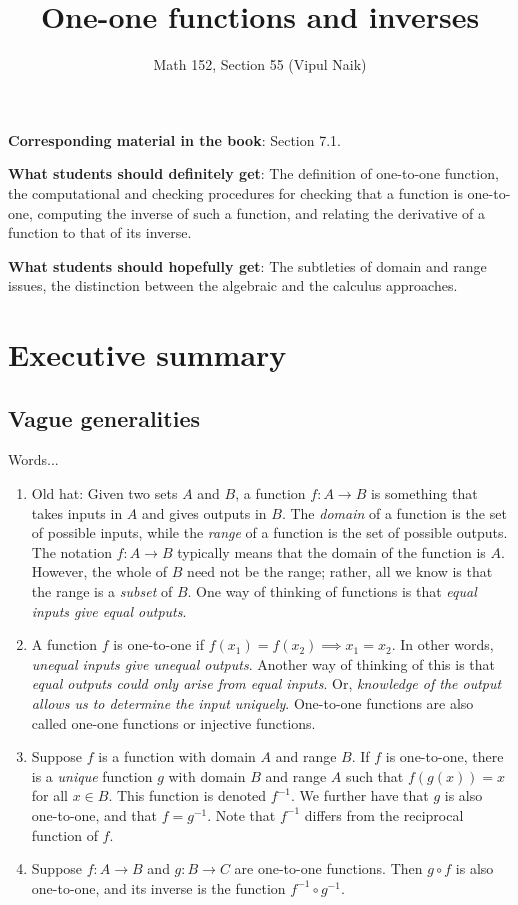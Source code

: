\documentclass[10pt]{amsart}
\title{One-one functions and inverses}
\author{Math 152, Section 55 (Vipul Naik)}
\begin{document}
\maketitle

{\bf Corresponding material in the book}: Section 7.1.

{\bf What students should definitely get}: The definition of
one-to-one function, the computational and checking procedures for
checking that a function is one-to-one, computing the inverse of such
a function, and relating the derivative of a function to that of its
inverse.

{\bf What students should hopefully get}: The subtleties of domain and
range issues, the distinction between the algebraic and the calculus
approaches.

\section*{Executive summary}

\subsection{Vague generalities}

Words...

\begin{enumerate}
\item Old hat: Given two sets $A$ and $B$, a function $f:A \to B$ is
  something that takes inputs in $A$ and gives outputs in $B$. The
  {\em domain} of a function is the set of possible inputs, while the
  {\em range} of a function is the set of possible outputs. The
  notation $f:A \to B$ typically means that the domain of the function
  is $A$. However, the whole of $B$ need not be the range; rather, all
  we know is that the range is a {\em subset} of $B$. One way of
  thinking of functions is that {\em equal inputs give equal outputs}.
\item A function $f$ is one-to-one if $f(x_1) = f(x_2) \implies x_1 =
  x_2$. In other words, {\em unequal inputs give unequal
  outputs}. Another way of thinking of this is that {\em equal outputs
  could only arise from equal inputs}. Or, {\em knowledge of the
  output allows us to determine the input uniquely}. One-to-one
  functions are also called one-one functions or injective functions.
\item Suppose $f$ is a function with domain $A$ and range $B$. If $f$
  is one-to-one, there is a {\em unique} function $g$ with domain $B$
  and range $A$ such that $f(g(x)) = x$ for all $x \in B$. This
  function is denoted $f^{-1}$.  We further have that $g$ is also
  one-to-one, and that $f = g^{-1}$. Note that $f^{-1}$ differs from
  the reciprocal function of $f$.
\item Suppose $f: A \to B$ and $g:B \to C$ are one-to-one
  functions. Then $g \circ f$ is also one-to-one, and its inverse is
  the function $f^{-1} \circ g^{-1}$.
\end{enumerate}
\end{document}
